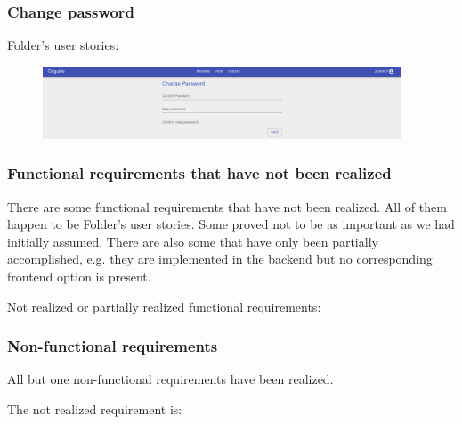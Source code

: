 \subsubsection{Change password}

Folder's user stories:
\begin{enumerate}
	\setcounter{enumi}{18}
\end{enumerate}

\begin{figure}[H]
  	\centering
    \includegraphics[width=0.95\textwidth]{assets/5-passwordChange.png}
\end{figure}

\subsubsection{Functional requirements that have not been realized}

There are some functional requirements that have not been realized.
All of them happen to be Folder's user stories.
Some proved not to be as important as we had initially assumed.
There are also some that have only been partially accomplished, e.g. they are 
implemented in the backend but no corresponding frontend option is present.
\smallskip

Not realized or partially realized functional requirements:
\begin{enumerate}
	\setcounter{enumi}{12}

	
	\setcounter{enumi}{19}
\end{enumerate}

\subsubsection{Non-functional requirements}

All but one non-functional requirements have been realized.

The not realized requirement is:
\begin{enumerate}
	\setcounter{enumi}{4}
\end{enumerate}

